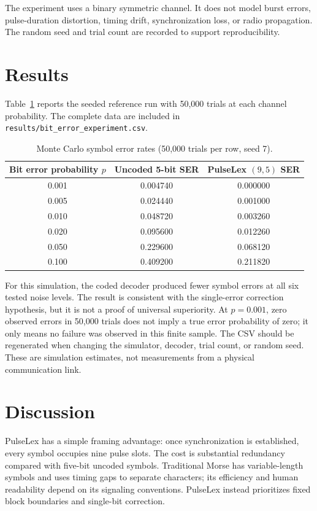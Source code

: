 \documentclass[11pt,a4paper]{article}
\begin{document}
The experiment uses a binary symmetric channel. It does not model burst
errors, pulse-duration distortion, timing drift, synchronization loss, or
radio propagation. The random seed and trial count are recorded to support
reproducibility.

\section{Results}
Table~\ref{tab:results} reports the seeded reference run with 50,000 trials
at each channel probability. The complete data are included in
\texttt{results/bit\_error\_experiment.csv}.

\begin{table}[h]
\centering
\caption{Monte Carlo symbol error rates (50,000 trials per row, seed 7).}
\label{tab:results}
\begin{tabular}{ccc}
\toprule
Bit error probability $p$ & Uncoded 5-bit SER & PulseLex $(9,5)$ SER \\
\midrule
0.001 & 0.004740 & 0.000000 \\
0.005 & 0.024440 & 0.001000 \\
0.010 & 0.048720 & 0.003260 \\
0.020 & 0.095600 & 0.012260 \\
0.050 & 0.229600 & 0.068120 \\
0.100 & 0.409200 & 0.211820 \\
\bottomrule
\end{tabular}
\end{table}

For this simulation, the coded decoder produced fewer symbol errors at all
six tested noise levels. The result is consistent with the single-error
correction hypothesis, but it is not a proof of universal superiority.
At $p=0.001$, zero observed errors in 50,000 trials does not imply a true
error probability of zero; it only means no failure was observed in this
finite sample. The CSV should be regenerated when changing the simulator,
decoder, trial count, or random seed. These are simulation estimates, not
measurements from a physical communication link.

\section{Discussion}
PulseLex has a simple framing advantage: once synchronization is established,
every symbol occupies nine pulse slots. The cost is substantial redundancy
compared with five-bit uncoded symbols. Traditional Morse has variable-length
symbols and uses timing gaps to separate characters; its efficiency and
human readability depend on its signaling conventions. PulseLex instead
prioritizes fixed block boundaries and single-bit correction.
\end{document}
